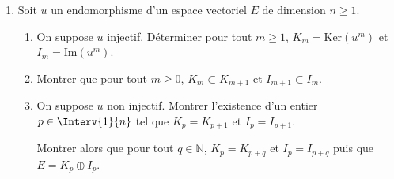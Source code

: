 \documentclass[a4paper,10pt]{report}
\begin{document}
\begin{Exercice}{}
\begin{enumerate}
\item Soit $u$ un endomorphisme d'un espace vectoriel $E$ de dimension $n \geq 1$.
\begin{enumerate}
\item On suppose $u$ injectif. Déterminer pour tout $m \geq 1$, $K_m = \textrm{Ker}(u^m)$ et $I_m = \textrm{Im}(u^m)$.
\item Montrer que pour tout $m \geq 0$, $K_m \subset K_{m+1}$ et $I_{m+1} \subset I_m$.
\item On suppose $u$ non injectif. Montrer l'existence d'un entier $p \in \Interv{1}{n}$ tel que $K_p=K_{p+1}$ et $I_p = I_{p+1}$.

\noindent Montrer alors que pour tout $q \in \mathbb{N}$, $K_p = K_{p+q}$ et $I_p = I_{p+q}$ puis que $E = K_p \oplus I_p$.
\end{enumerate}
\end{enumerate}
\end{Exercice} 
\end{document}
